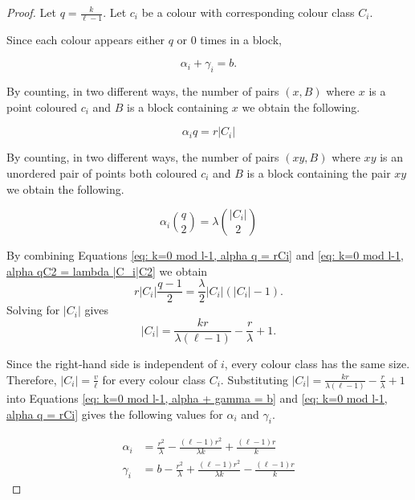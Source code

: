 \documentclass[12pt]{article}
\theoremstyle{definition}
\begin{document}
\begin{proof}

Let $q = \frac{k}{\ell - 1}$. Let $c_i$ be a colour with corresponding colour class $C_i$.

Since each colour appears either $q$ or $0$ times in a block,

\begin{equation}\label{eq: k=0 mod l-1, alpha + gamma = b}
    \alpha_i + \gamma_i = b.
\end{equation}

By counting, in two different ways, the number of pairs $(x,B)$ where $x$ is a point coloured $c_i$ and $B$ is a block containing $x$ we obtain the following.

\begin{equation}\label{eq: k=0 mod l-1, alpha q = rCi}
    \alpha_i q = r|C_i|
\end{equation}

By counting, in two different ways, the number of pairs $(xy, B)$ where $xy$ is an unordered pair of points both coloured $c_i$ and $B$ is a block containing the pair $xy$ we obtain the following.

\begin{equation}\label{eq: k=0 mod l-1, alpha qC2 = lambda |C_i|C2}
    \alpha_i \binom{q}{2} = \lambda \binom{|C_i|}{2}
\end{equation}

By combining Equations \eqref{eq: k=0 mod l-1, alpha q = rCi} and \eqref{eq: k=0 mod l-1, alpha qC2 = lambda |C_i|C2} we obtain \[r|C_i| \frac{q-1}{2} = \frac{\lambda}{2}|C_i| (|C_i| - 1).\] Solving for $|C_i|$ gives 
\begin{equation}\label{eq: formula for |Ci| in terms of krlambda}
    |C_i| = \frac{kr}{\lambda (\ell -1)} - \frac{r}{\lambda} + 1.
\end{equation}

Since the right-hand side is independent of $i$, every colour class has the same size. Therefore, $|C_i| = \frac{v}{\ell}$ for every colour class $C_i$. Substituting $|C_i| = \frac{kr}{\lambda (\ell -1)} - \frac{r}{\lambda} + 1$ into Equations \eqref{eq: k=0 mod l-1, alpha + gamma = b} and \eqref{eq: k=0 mod l-1, alpha q = rCi} gives the following values for $\alpha_i$ and $\gamma_i$.

\begin{align}
    \alpha_i &= \frac{r^2}{\lambda} - \frac{(\ell - 1) r^2}{\lambda k} + \frac{(\ell - 1)r}{k} \label{eq: alpha formula} \\
    \gamma_i &= b - \frac{r^2}{\lambda} + \frac{(\ell - 1) r^2}{\lambda k} - \frac{(\ell - 1)r}{k} \label{eq: gamma formula}
\end{align}

\end{proof}
\end{document}
